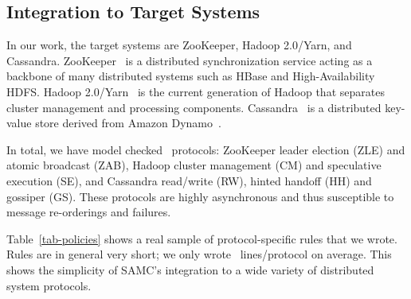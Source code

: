\vten %

\subsection{Integration to Target Systems}
\label{imp-targets}


In our work, the target systems are ZooKeeper, Hadoop 2.0/Yarn, and
Cassandra.  ZooKeeper~\cite{Hunt+10-ZooKeeperPaper} is a distributed
synchronization service acting as a backbone of many distributed systems
such as HBase and High-Availability HDFS.  Hadoop
2.0/Yarn~\cite{Kumar+13-Yarn} is the current generation of Hadoop that
separates cluster management and processing components.
Cassandra~\cite{Lakshman+09-Cassandra} is a distributed key-value store
derived from Amazon Dynamo~\cite{DeCandia+07-Dynamo}.

In total, we have model checked \numProtocols\ protocols: ZooKeeper
leader election (ZLE) and atomic broadcast (ZAB), Hadoop cluster
management (CM) and speculative execution (SE), and Cassandra
read/write (RW), hinted handoff (HH) and gossiper (GS).  These
protocols are highly asynchronous and thus susceptible to message
re-orderings and failures.

Table~\ref{tab-policies} shows a real sample of protocol-specific
rules that we wrote.  Rules are in general very short; we only wrote
\numLinesRule\ lines/protocol on average.  This shows the simplicity
of SAMC's integration to a wide variety of distributed system protocols.




